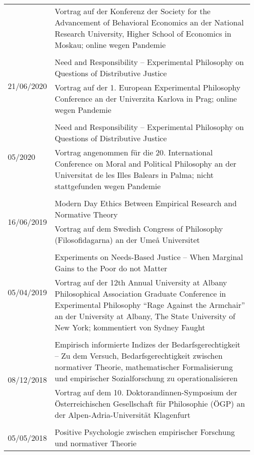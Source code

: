 \documentclass[a4paper,10pt]{article}
\begin{document}
\begin{longtable}{p{}p{}}
& \footnotesize{Vortrag auf der Konferenz der Society for the Advancement of Behavioral Economics an der National Research University, Higher School of Economics in Moskau; online wegen Pandemie}\\
\\
\multirow{2}{1,75cm}{\footnotesize{21/06/2020}} & Need and Responsibility -- Experimental Philosophy on Questions of Distributive Justice\\
& \footnotesize{Vortrag auf der 1. European Experimental Philosophy Conference an der Univerzita Karlova in Prag; online wegen Pandemie}\\
\\
\multirow{2}{1,75cm}{\footnotesize{05/2020}} & Need and Responsibility -- Experimental Philosophy on Questions of Distributive Justice\\
& \footnotesize{Vortrag angenommen für die 20. International Conference on Moral and Political Philosophy an der Universitat de les Illes Balears in Palma; nicht stattgefunden wegen Pandemie}\\
\\
\multirow{2}{1,75cm}{\footnotesize{16/06/2019}} & Modern Day Ethics Between Empirical Research and Normative Theory\\
& \footnotesize{Vortrag auf dem Swedish Congress of Philosophy (Filosofidagarna) an der Umeå Universitet}\\
\\
\multirow{2}{1,75cm}{\footnotesize{05/04/2019}} & Experiments on Needs-Based Justice -- When Marginal Gains to the Poor do not Matter\\
& \footnotesize{Vortrag auf der 12th Annual University at Albany Philosophical Association Graduate Conference in Experimental Philosophy \enquote{Rage Against the Armchair} an der University at Albany, The State University of New York; kommentiert von Sydney Faught}\\
\\
\multirow{2}{1,75cm}{\footnotesize{08/12/2018}} & Empirisch informierte Indizes der Bedarfsgerechtigkeit -- Zu dem Versuch, Bedarfsgerechtigkeit zwischen normativer Theorie, mathematischer Formalisierung und empirischer Sozialforschung zu operationalisieren\\
& \footnotesize{Vortrag auf dem 10. Doktorandinnen-Symposium der Österreichischen Gesellschaft für Philosophie (ÖGP) an der Alpen-Adria-Universität Klagenfurt}\\
\\
\multirow{2}{1,75cm}{\footnotesize{05/05/2018}} & Positive Psychologie zwischen empirischer Forschung und normativer Theorie\\

\end{longtable}
\end{document}
